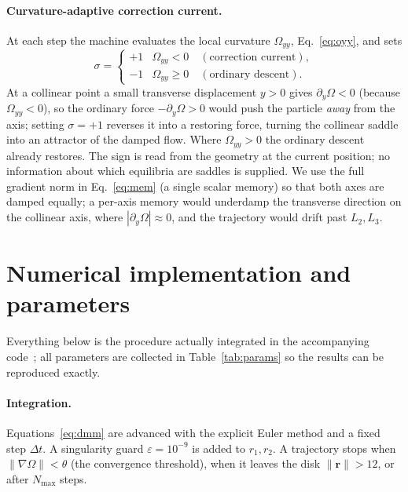 \documentclass[aip,preprint,amsmath,amssymb,floatfix]{revtex4-2}
\begin{document}
\paragraph{Curvature-adaptive correction current.}
At each step the machine evaluates the local curvature $\Omega_{yy}$,
Eq.~\eqref{eq:oyy}, and sets
\begin{equation}
  \sigma =
  \begin{cases}
    +1 & \Omega_{yy}<0 \quad(\text{correction current}),\\
    -1 & \Omega_{yy}\ge0 \quad(\text{ordinary descent}).
  \end{cases}
  \label{eq:sigma}
\end{equation}
At a collinear point a small transverse displacement $y>0$ gives
$\partial_y\Omega<0$ (because $\Omega_{yy}<0$), so the ordinary force
$-\partial_y\Omega>0$ would push the particle \emph{away} from the axis; setting
$\sigma=+1$ reverses it into a restoring force, turning the collinear saddle into
an attractor of the damped flow. Where $\Omega_{yy}>0$ the ordinary descent
already restores. The sign is read from the geometry at the current position; no
information about which equilibria are saddles is supplied. We use the full
gradient norm in Eq.~\eqref{eq:mem} (a single scalar memory) so that both axes are
damped equally; a per-axis memory would underdamp the transverse direction on the
collinear axis, where $|\partial_y\Omega|\approx0$, and the trajectory would drift
past $L_2,L_3$.

\section{Numerical implementation and parameters}\label{sec:params}

Everything below is the procedure actually integrated in the accompanying
code~\cite{github2026}; all parameters are collected in
Table~\ref{tab:params} so the results can be reproduced exactly.

\paragraph{Integration.}
Equations~\eqref{eq:dmm} are advanced with the explicit Euler method and a fixed
step $\Delta t$. A singularity guard $\varepsilon=10^{-9}$ is added to $r_1,r_2$.
A trajectory stops when $\lVert\nabla\Omega\rVert<\theta$ (the convergence
threshold), when it leaves the disk $\lVert\mathbf r\rVert>12$, or after
$N_{\max}$ steps.
\end{document}
